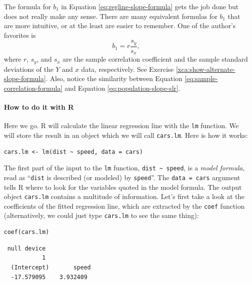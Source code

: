 \documentclass[captions=tableheading]{scrbook}
\begin{document}
\begin{rem}
The formula for \( b_{1} \) in Equation \ref{eq:regline-slope-formula} gets the job done but does not really make any sense. There are many equivalent formulas for \( b_{1} \) that are more intuitive, or at the least are easier to remember. One of the author's favorites is
\begin{equation}
b_{1} = r\frac{s_{y}}{s_{x}},\label{eq:sample-correlation-formula}
\end{equation}
where \(r\), \( s_{y} \), and \( s_{x} \) are the sample correlation coefficient and the sample standard deviations of the \(Y\) and \(x\) data, respectively. See Exercise \ref{xca:show-alternate-slope-formula}. Also, notice the similarity between Equation \ref{eq:sample-correlation-formula} and Equation \ref{eq:population-slope-slr}.
\end{rem}

\paragraph*{How to do it with \textsf{R}}



Here we go. \textsf{R} will calculate the linear regression line with the \texttt{lm} function. We will store the result in an object which we will call \texttt{cars.lm}. Here is how it works:


\begin{verbatim}
cars.lm <- lm(dist ~ speed, data = cars)
\end{verbatim}

The first part of the input to the \texttt{lm} function, \texttt{dist \textasciitilde{} speed}, is a \emph{model formula}, read as ``\texttt{dist} is described (or modeled) by \texttt{speed}''. The \texttt{data = cars} argument tells \textsf{R} where to look for the variables quoted in the model formula. The output object \texttt{cars.lm} contains a multitude of information. Let's first take a look at the coefficients of the fitted regression line, which are extracted by the \texttt{coef} function (alternatively, we could just type \texttt{cars.lm} to see the same thing):


\begin{verbatim}
coef(cars.lm)
\end{verbatim}

\begin{verbatim}
 null device 
           1
  (Intercept)       speed 
  -17.579095    3.932409
\end{verbatim}
\end{document}
